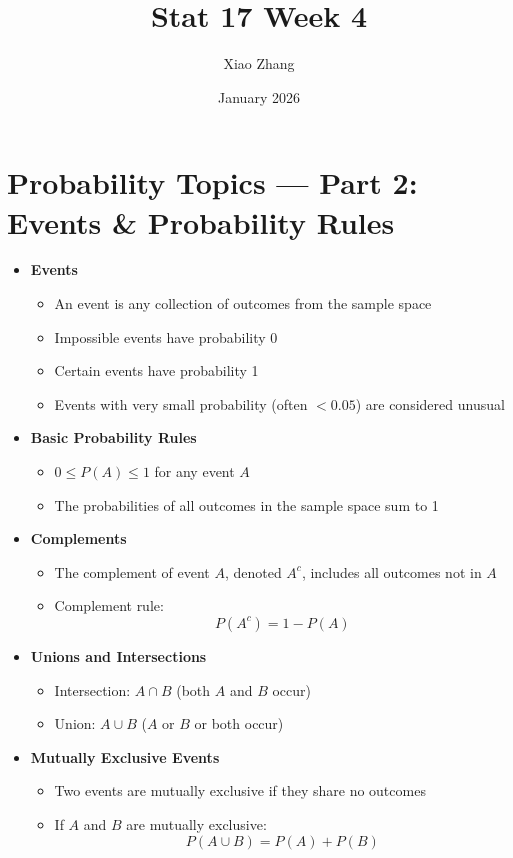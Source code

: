 \documentclass{article}
\title{Stat 17 Week 4}
\author{Xiao Zhang}
\date{January 2026}
\begin{document}
\maketitle



\section*{Probability Topics — Part 2: Events \& Probability Rules}

\begin{itemize}
  \item \textbf{Events}
  \begin{itemize}
    \item An event is any collection of outcomes from the sample space
    \item Impossible events have probability 0
    \item Certain events have probability 1
    \item Events with very small probability (often $<0.05$) are considered unusual
  \end{itemize}

  \item \textbf{Basic Probability Rules}
  \begin{itemize}
    \item $0 \le P(A) \le 1$ for any event $A$
    \item The probabilities of all outcomes in the sample space sum to 1
  \end{itemize}

  \item \textbf{Complements}
  \begin{itemize}
    \item The complement of event $A$, denoted $A^c$, includes all outcomes not in $A$
    \item Complement rule:
    \[
      P(A^c) = 1 - P(A)
    \]
  \end{itemize}


  \item \textbf{Unions and Intersections}
  \begin{itemize}
    \item Intersection: $A \cap B$ (both $A$ and $B$ occur)
    \item Union: $A \cup B$ ($A$ or $B$ or both occur)
  \end{itemize}

  \item \textbf{Mutually Exclusive Events}
  \begin{itemize}
    \item Two events are mutually exclusive if they share no outcomes
    \item If $A$ and $B$ are mutually exclusive:
    \[
      P(A \cup B) = P(A) + P(B)
    \]
  \end{itemize}


\end{itemize}
\end{document}
